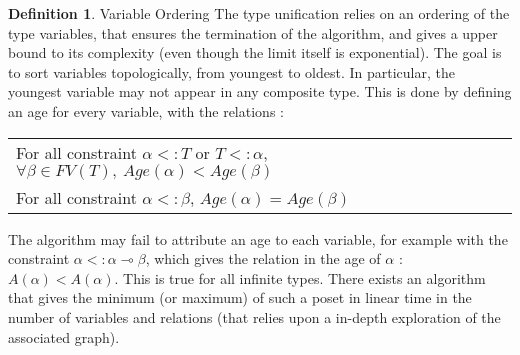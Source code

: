 \documentclass[10pt]{article}
\theoremstyle{plain}
\theoremstyle{definition}
\newtheorem{defn}{Definition}[subsection] %
\begin{document}
\begin{defn}{Variable Ordering}
	The type unification relies on an ordering of the type variables, that ensures the termination of the algorithm, and gives a upper
	bound to its complexity (even though the limit itself is exponential).
	The goal is to sort variables topologically, from youngest to oldest. In particular,
  the youngest variable may not appear in any composite type. This is done by defining an age for every variable, with the
  relations :
  	\begin{center}
  	\begin{tabular}{l}
  	  For all constraint $\alpha <: T$ or $T <: \alpha$, $\forall \beta \in FV(T), ~ Age (\alpha) < Age (\beta)$ \\
  	  For all constraint $\alpha <: \beta$, $Age (\alpha) = Age (\beta)$
  	\end{tabular}
  	\end{center}
  	The algorithm may fail to attribute an age to each variable, for example with the constraint $\alpha <: \alpha \multimap \beta$, which gives the
  	relation in the age of $\alpha$ : $A(\alpha) < A(\alpha)$. This is true for all infinite types.
  	There exists an algorithm that gives the minimum (or maximum) of such a poset in linear time in the number of variables and relations
  	(that relies upon a in-depth exploration of the associated graph).
\end{defn}
\end{document}
